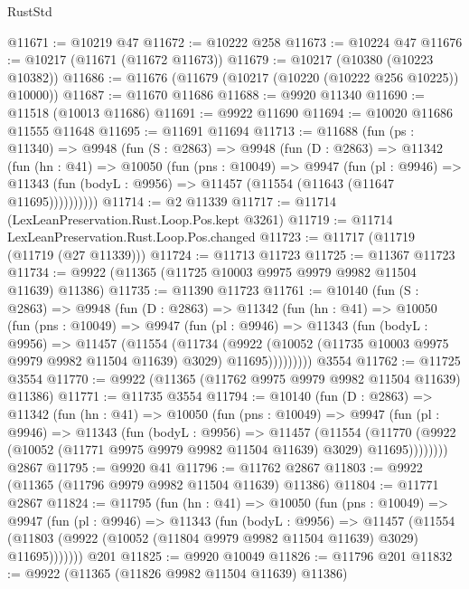 \begin{lexlean}{RustStd}
\begin{coremodule}
@11671 := @10219 @47
@11672 := @10222 @258
@11673 := @10224 @47
@11676 := @10217 (@11671 (@11672 @11673))
@11679 := @10217 (@10380 (@10223 @10382))
@11686 := @11676 (@11679 (@10217 (@10220 (@10222 @256 @10225)) @10000))
@11687 := @11670 @11686
@11688 := @9920 @11340
@11690 := @11518 (@10013 @11686)
@11691 := @9922 @11690
@11694 := @10020 @11686 @11555 @11648
@11695 := @11691 @11694
@11713 := @11688
    (fun (ps : @11340) =>
    @9948
      (fun (S : @2863) =>
      @9948
        (fun (D : @2863) =>
        @11342
          (fun (hn : @41) =>
          @10050
            (fun (pns : @10049) =>
            @9947
              (fun (pl : @9946) =>
              @11343 (fun (bodyL : @9956) => @11457 (@11554 (@11643 (@11647 @11695))))))))))
@11714 := @2 @11339
@11717 := @11714 (LexLeanPreservation.Rust.Loop.Pos.kept @3261)
@11719 := @11714 LexLeanPreservation.Rust.Loop.Pos.changed
@11723 := @11717 (@11719 (@11719 (@27 @11339)))
@11724 := @11713 @11723
@11725 := @11367 @11723
@11734 := @9922 (@11365 (@11725 @10003 @9975 @9979 @9982 @11504 @11639) @11386)
@11735 := @11390 @11723
@11761 := @10140
    (fun (S : @2863) =>
    @9948
      (fun (D : @2863) =>
      @11342
        (fun (hn : @41) =>
        @10050
          (fun (pns : @10049) =>
          @9947
            (fun (pl : @9946) =>
            @11343
              (fun (bodyL : @9956) =>
              @11457
                (@11554
                  (@11734
                    (@9922
                      (@10052 (@11735 @10003 @9975 @9979 @9982 @11504 @11639) @3029)
                      @11695)))))))))
    @3554
@11762 := @11725 @3554
@11770 := @9922 (@11365 (@11762 @9975 @9979 @9982 @11504 @11639) @11386)
@11771 := @11735 @3554
@11794 := @10140
    (fun (D : @2863) =>
    @11342
      (fun (hn : @41) =>
      @10050
        (fun (pns : @10049) =>
        @9947
          (fun (pl : @9946) =>
          @11343
            (fun (bodyL : @9956) =>
            @11457
              (@11554
                (@11770
                  (@9922 (@10052 (@11771 @9975 @9979 @9982 @11504 @11639) @3029) @11695))))))))
    @2867
@11795 := @9920 @41
@11796 := @11762 @2867
@11803 := @9922 (@11365 (@11796 @9979 @9982 @11504 @11639) @11386)
@11804 := @11771 @2867
@11824 := @11795
    (fun (hn : @41) =>
    @10050
      (fun (pns : @10049) =>
      @9947
        (fun (pl : @9946) =>
        @11343
          (fun (bodyL : @9956) =>
          @11457
            (@11554 (@11803 (@9922 (@10052 (@11804 @9979 @9982 @11504 @11639) @3029) @11695)))))))
    @201
@11825 := @9920 @10049
@11826 := @11796 @201
@11832 := @9922 (@11365 (@11826 @9982 @11504 @11639) @11386)

\end{coremodule}
\end{lexlean}
